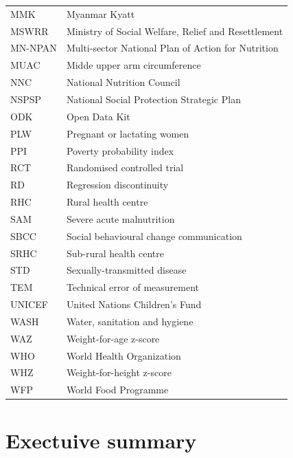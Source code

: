 \documentclass[12pt,a4paper]{article}
\begin{document}
\begin{table}[H]
\begin{tabular}{l>{\raggedright\arraybackslash}p{8cm}}
MMK & Myanmar Kyatt\\
\rowcolor{gray!6}  MSWRR & Ministry of Social Welfare, Relief and Resettlement\\
MN-NPAN & Multi-sector National Plan of Action for Nutrition\\
\addlinespace
\rowcolor{gray!6}  MUAC & Midde upper arm circumference\\
NNC & National Nutrition Council\\
\rowcolor{gray!6}  NSPSP & National Social Protection Strategic Plan\\
ODK & Open Data Kit\\
\rowcolor{gray!6}  PLW & Pregnant or lactating women\\
\addlinespace
PPI & Poverty probability index\\
\rowcolor{gray!6}  RCT & Randomised controlled trial\\
RD & Regression discontinuity\\
\rowcolor{gray!6}  RHC & Rural health centre\\
SAM & Severe acute malnutrition\\
\addlinespace
\rowcolor{gray!6}  SBCC & Social behavioural change communication\\
SRHC & Sub-rural health centre\\
\rowcolor{gray!6}  STD & Sexually-transmitted disease\\
TEM & Technical error of measurement\\
\rowcolor{gray!6}  UNICEF & United Nations Children's Fund\\
\addlinespace
WASH & Water, sanitation and hygiene\\
\rowcolor{gray!6}  WAZ & Weight-for-age z-score\\
WHO & World Health Organization\\
\rowcolor{gray!6}  WHZ & Weight-for-height z-score\\
WFP & World Food Programme\\
\bottomrule
\end{tabular}
\end{table}

\newpage

\hypertarget{exectuive-summary}{%
\section*{Exectuive summary}\label{exectuive-summary}}

\newpage
\end{document}
